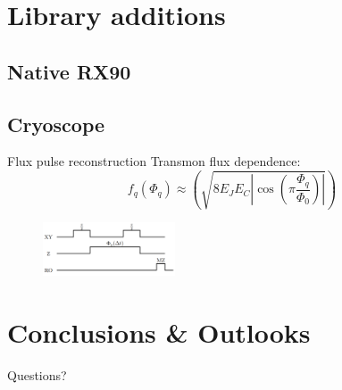 \documentclass[aspectratio=169,10pt]{beamer}
\begin{document}
%  

\section{Library additions}

\subsection{Native RX90}

%  

\subsection{Cryoscope}

\begin{frame}[t,fragile]{Flux pulse reconstruction}
  Transmon flux dependence:
  \begin{equation*}
    f_q(\Phi_q) \approx \left( \sqrt{8E_J E_C \left| \cos\left(\pi \frac{\Phi_q}{\Phi_0}\right) \right|} \right)
  \end{equation*}

  \begin{figure}
    \includegraphics[width=0.35\textwidth]{figures/cryoscope_pulse.png}
  \end{figure}
\end{frame}

%  
%
%  

\section{Conclusions \& Outlooks}


\begin{frame}[t,standout]
\Large
Questions?
\end{frame}
\end{document}
